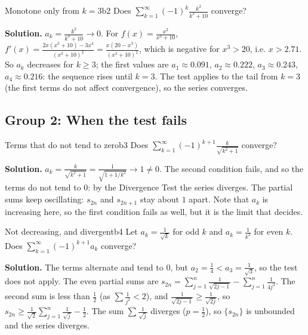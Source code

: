 \documentclass[11pt]{article}
\begin{document}
\begin{exmp}{Monotone only from $k=3$}{b2}
Does $\displaystyle\sum_{k=1}^\infty(-1)^k\frac{k^2}{k^3+10}$ converge?

\textbf{Solution.} $a_k=\frac{k^2}{k^3+10}\to0$. For $f(x)=\frac{x^2}{x^3+10}$, $f'(x)=\frac{2x(x^3+10)-3x^4}{(x^3+10)^2}=\frac{x(20-x^3)}{(x^3+10)^2}$, which is negative for $x^3>20$, i.e. $x>2.71$. So $a_k$ decreases for $k\ge3$; the first values are $a_1\approx0.091$, $a_2\approx0.222$, $a_3\approx0.243$, $a_4\approx0.216$: the sequence rises until $k=3$. The test applies to the tail from $k=3$ (the first terms do not affect convergence), so the series converges.
\end{exmp}

\subsection*{Group 2: When the test fails}

\begin{exmp}{Terms that do not tend to zero}{b3}
Does $\displaystyle\sum_{k=1}^\infty(-1)^{k+1}\frac k{\sqrt{k^2+1}}$ converge?

\textbf{Solution.} $a_k=\frac k{\sqrt{k^2+1}}=\frac1{\sqrt{1+1/k^2}}\to1\ne0$. The second condition fails, and so the terms do not tend to $0$: by the Divergence Test the series diverges. The partial sums keep oscillating: $s_{2n}$ and $s_{2n+1}$ stay about $1$ apart. Note that $a_k$ is increasing here, so the first condition fails as well, but it is the limit that decides.
\end{exmp}

\begin{exmp}{Not decreasing, and divergent}{b4}
Let $a_k=\frac1{\sqrt k}$ for odd $k$ and $a_k=\frac1{k^2}$ for even $k$. Does $\displaystyle\sum_{k=1}^\infty(-1)^{k+1}a_k$ converge?

\textbf{Solution.} The terms alternate and tend to $0$, but $a_2=\frac14<a_3=\frac1{\sqrt3}$, so the test does not apply. The even partial sums are $s_{2n}=\sum_{j=1}^n\frac1{\sqrt{2j-1}}-\sum_{j=1}^n\frac1{4j^2}$. The second sum is less than $\frac12$ (as $\sum\frac1{j^2}<2$), and $\frac1{\sqrt{2j-1}}\ge\frac1{\sqrt{2j}}$, so $s_{2n}\ge\frac1{\sqrt2}\sum_{j=1}^n\frac1{\sqrt j}-\frac12$. The sum $\sum\frac1{\sqrt j}$ diverges ($p=\frac12$), so $\{s_{2n}\}$ is unbounded and the series diverges.
\end{exmp}
\end{document}
